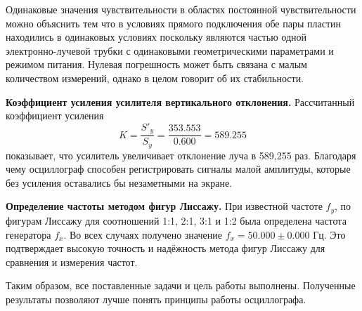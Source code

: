 \documentclass[a4paper,14pt]{extarticle}
\theoremstyle{plain}
\theoremstyle{remark}
\theoremstyle{definition}
\begin{document}
    Одинаковые значения чувствительности в областях постоянной чувствительности можно объяснить тем что в условиях прямого подключения обе пары пластин находились в одинаковых условиях поскольку являются частью одной электронно-лучевой трубки с одинаковыми геометрическими параметрами и режимом питания. Нулевая погрешность может быть связана с малым количеством измерений, однако в целом говорит об их стабильности.

 \textbf{Коэффициент усиления усилителя вертикального отклонения.} 
    Рассчитанный коэффициент усиления 
    \[
    K = \frac{S'_y}{S_y} = \frac{353.553}{0.600} = 589.255
    \]
    показывает, что усилитель увеличивает отклонение луча в 589,255 раз. Благодаря чему осциллограф способен регистрировать сигналы малой амплитуды, которые без усиления оставались бы незаметными на экране.

    \textbf{Определение частоты методом фигур Лиссажу.} 
    При известной частоте \(f_y\), по фигурам Лиссажу для соотношений 1:1, 2:1, 3:1 и 1:2 была определена частота генератора \(f_x\). Во всех случаях получено значение \(f_x = 50.000 \pm 0.000\) Гц. Это подтверждает высокую точность и надёжность метода фигур Лиссажу для сравнения и измерения частот.

Таким образом, все поставленные задачи и цель работы выполнены. Полученные результаты позволяют лучше понять принципы работы осциллографа.
\clearpage
\appendix
\end{document}
